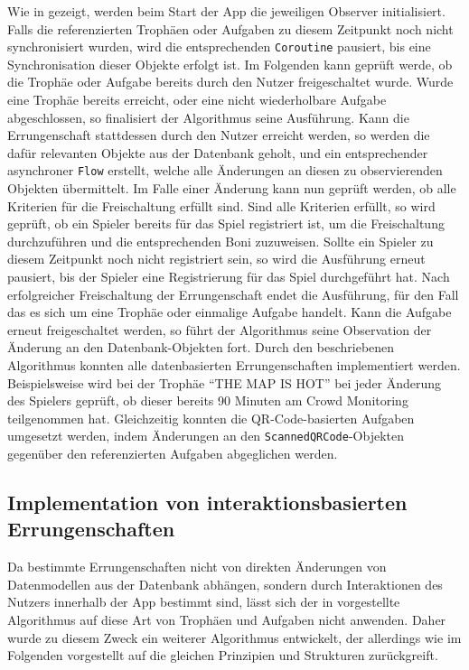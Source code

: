 Wie in  gezeigt, werden beim Start der App die jeweiligen Observer initialisiert. Falls die referenzierten Trophäen oder Aufgaben zu diesem Zeitpunkt noch nicht synchronisiert wurden, wird die entsprechenden \texttt{Coroutine} pausiert, bis eine Synchronisation dieser Objekte erfolgt ist. Im Folgenden kann geprüft werde, ob die Trophäe oder Aufgabe bereits durch den Nutzer freigeschaltet wurde. Wurde eine Trophäe bereits erreicht, oder eine nicht wiederholbare Aufgabe abgeschlossen, so finalisiert der Algorithmus seine Ausführung. Kann die Errungenschaft stattdessen durch den Nutzer erreicht werden, so werden die dafür relevanten Objekte aus der Datenbank geholt, und ein entsprechender asynchroner \texttt{Flow} erstellt, welche alle Änderungen an diesen zu observierenden Objekten übermittelt. Im Falle einer Änderung kann nun geprüft werden, ob alle Kriterien für die Freischaltung erfüllt sind. Sind alle Kriterien erfüllt, so wird geprüft, ob ein Spieler bereits für das Spiel registriert ist, um die Freischaltung durchzuführen und die entsprechenden Boni zuzuweisen. Sollte ein Spieler zu diesem Zeitpunkt noch nicht registriert sein, so wird die Ausführung erneut pausiert, bis der Spieler eine Registrierung für das Spiel durchgeführt hat. Nach erfolgreicher Freischaltung der Errungenschaft endet die Ausführung, für den Fall das es sich um eine Trophäe oder einmalige Aufgabe handelt. Kann die Aufgabe erneut freigeschaltet werden, so führt der Algorithmus seine Observation der Änderung an den Datenbank-Objekten fort. \newpage Durch den beschriebenen Algorithmus konnten alle datenbasierten Errungenschaften implementiert werden. Beispielsweise wird bei der Trophäe \enquote{THE MAP IS HOT} bei jeder Änderung des Spielers geprüft, ob dieser bereits 90 Minuten am Crowd Monitoring teilgenommen hat. Gleichzeitig konnten die QR-Code-basierten Aufgaben umgesetzt werden, indem Änderungen an den \texttt{ScannedQRCode}-Objekten gegenüber den referenzierten Aufgaben abgeglichen werden.

\subsection{Implementation von interaktionsbasierten Errungenschaften}

Da bestimmte Errungenschaften nicht von direkten Änderungen von Datenmodellen aus der Datenbank abhängen, sondern durch Interaktionen des Nutzers innerhalb der App bestimmt sind, lässt sich der in  vorgestellte Algorithmus auf diese Art von Trophäen und Aufgaben nicht anwenden. Daher wurde zu diesem Zweck ein weiterer Algorithmus entwickelt, der allerdings wie im Folgenden vorgestellt auf die gleichen Prinzipien und Strukturen zurückgreift.

